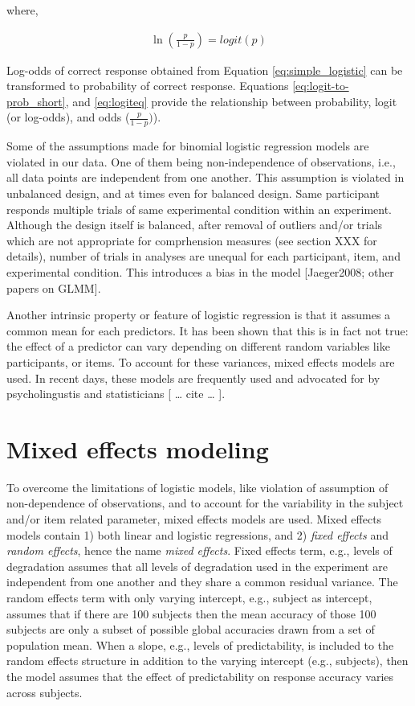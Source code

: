 \documentclass[a4paper, nobind]{templates/ociamthesis}
\begin{document}
where,

\begin{align} \label{eq:logiteq}
\ln(\frac{p}{1-p}) =
{logit}(p)
\end{align}

Log-odds of correct response obtained from Equation \ref{eq:simple_logistic} can be transformed to probability of correct response. Equations \ref{eq:logit-to-prob_short}, and \ref{eq:logiteq} provide the relationship between probability, logit (or log-odds), and odds (\(\frac{p}{1-p})\)).

Some of the assumptions made for binomial logistic regression models are violated in our data.
One of them being non-independence of observations, i.e., all data points are independent from one another.
This assumption is violated in unbalanced design, and at times even for balanced design.
Same participant responds multiple trials of same experimental condition within an experiment.
Although the design itself is balanced, after removal of outliers and/or trials which are not appropriate for comprhension measures (see section XXX for details), number of trials in analyses are unequal for each participant, item, and experimental condition.
This introduces a bias in the model {[}Jaeger2008; other papers on GLMM{]}.

Another intrinsic property or feature of logistic regression is that it assumes a common mean for each predictors.
It has been shown that this is in fact not true: the effect of a predictor can vary depending on different random variables like participants, or items.
To account for these variances, mixed effects models are used.
In recent days, these models are frequently used and advocated for by psycholingustis and statisticians {[} \ldots{} cite \ldots{} {]}.

\hypertarget{mixed-effects-modeling}{%
\section{Mixed effects modeling}\label{mixed-effects-modeling}}

To overcome the limitations of logistic models, like violation of assumption of non-dependence of observations, and to account for the variability in the subject and/or item related parameter, mixed effects models are used.
Mixed effects models contain 1) both linear and logistic regressions, and 2) \emph{fixed effects} and \emph{random effects}, hence the name \emph{mixed effects}.
Fixed effects term, e.g., levels of degradation assumes that all levels of degradation used in the experiment are independent from one another and they share a common residual variance.
The random effects term with only varying intercept, e.g., subject as intercept, assumes that if there are 100 subjects then the mean accuracy of those 100 subjects are only a subset of possible global accuracies drawn from a set of population mean.
When a slope, e.g., levels of predictability, is included to the random effects structure in addition to the varying intercept (e.g., subjects), then the model assumes that the effect of predictability on response accuracy varies across subjects.
\end{document}

